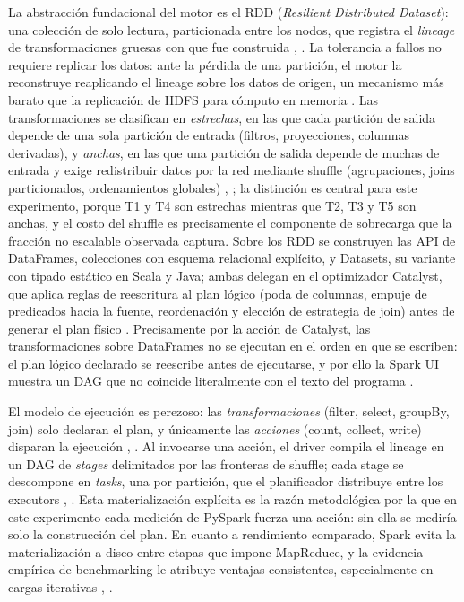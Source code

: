 \documentclass[10pt,journal]{IEEEtran}
\begin{document}
La abstracci\'on fundacional del motor es el RDD (\emph{Resilient Distributed
Dataset}): una colecci\'on de solo lectura, particionada entre los nodos, que
registra el \emph{lineage} de transformaciones gruesas con que fue construida
\cite{zaharia2012}, \cite{zaharia2016}. La tolerancia a fallos no requiere replicar los datos: ante
la p\'erdida de una partici\'on, el motor la reconstruye reaplicando el lineage
sobre los datos de origen, un mecanismo m\'as barato que la replicaci\'on de
HDFS para c\'omputo en memoria \cite{zaharia2016}. Las
transformaciones se clasifican en \emph{estrechas}, en las que cada partici\'on
de salida depende de una sola partici\'on de entrada (filtros, proyecciones,
columnas derivadas), y \emph{anchas}, en las que una partici\'on de salida
depende de muchas de entrada y exige redistribuir datos por la red mediante
shuffle (agrupaciones, joins particionados, ordenamientos globales)
\cite{zaharia2012}, \cite{chambers2018}; la distinci\'on es central para este
experimento, porque T1 y T4 son estrechas mientras que T2, T3 y T5 son anchas,
y el costo del shuffle es precisamente el componente de sobrecarga que la
fracci\'on no escalable observada captura. Sobre los RDD se construyen las API
de DataFrames, colecciones con esquema relacional expl\'icito, y Datasets, su
variante con tipado est\'atico en Scala y Java; ambas delegan en el optimizador
Catalyst, que aplica reglas de reescritura al plan l\'ogico (poda de columnas,
empuje de predicados hacia la fuente, reordenaci\'on y elecci\'on de estrategia
de join) antes de generar el plan f\'isico \cite{armbrust2015}. Precisamente por la acci\'on de Catalyst, las
transformaciones sobre DataFrames no se ejecutan en el orden en que se
escriben: el plan l\'ogico declarado se reescribe antes de ejecutarse, y por
ello la Spark UI muestra un DAG que no coincide literalmente con el texto del
programa \cite{armbrust2015}.

El modelo de ejecuci\'on es perezoso: las \emph{transformaciones} (filter,
select, groupBy, join) solo declaran el plan, y \'unicamente las
\emph{acciones} (count, collect, write) disparan la ejecuci\'on
\cite{zaharia2016}, \cite{armbrust2015}. Al invocarse una acci\'on, el driver
compila el lineage en un DAG de \emph{stages} delimitados por las fronteras de
shuffle; cada stage se descompone en \emph{tasks}, una por partici\'on, que el
planificador distribuye entre los executors \cite{zaharia2016},
\cite{armbrust2015}. Esta materializaci\'on expl\'icita es la raz\'on
metodol\'ogica por la que en este experimento cada medici\'on de PySpark fuerza
una acci\'on: sin ella se medir\'ia solo la construcci\'on del plan. En cuanto a
rendimiento comparado, Spark evita la materializaci\'on a disco entre etapas
que impone MapReduce, y la evidencia emp\'irica de benchmarking le atribuye
ventajas consistentes, especialmente en cargas iterativas \cite{ahmed2020},
\cite{zaharia2016}.
\end{document}
